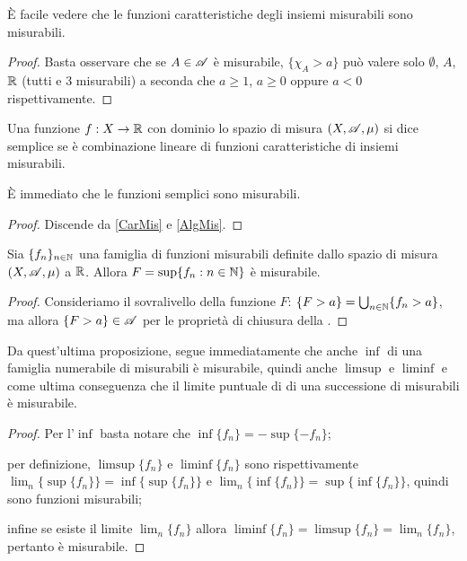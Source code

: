 \begin{remark}
	\label{CarMis}
	È facile vedere che le funzioni caratteristiche degli insiemi misurabili sono misurabili.
\end{remark}
\begin{proof}
	Basta osservare che se $A\in \mathscr A$ è misurabile, $\{ \chi_A > a\}$ può valere solo $\emptyset$, $A$, $\mathbb R$ (tutti e 3 misurabili) a seconda che
	$a\geq 1$, $a\geq 0$ oppure $a < 0$ rispettivamente.
\end{proof}

\begin{definition}
	Una funzione $f:X \rightarrow \mathbb R$ con dominio lo spazio di misura $(X,\mathscr A,\mu)$ si dice semplice se è combinazione lineare di
	funzioni caratteristiche di insiemi misurabili.
\end{definition}
\begin{remark}
	È immediato che le funzioni semplici sono misurabili.
\end{remark}
\begin{proof}
	Discende da \cref{CarMis} e \cref{AlgMis}.
\end{proof}


\begin{proposition}
	Sia $\{f_n\}_{n\in \mathbb N}$ una famiglia di funzioni misurabili definite dallo spazio di misura $(X,\mathscr A,\mu)$ a $\mathbb R$.
	Allora $F=\sup\{f_n:n\in \mathbb N\}$ è misurabile.
\end{proposition}
\begin{proof}
	Consideriamo il sovralivello della funzione $F$: $\{F>a\}=\bigcup_{n\in \mathbb N}\{f_n>a\}$, ma allora $\{F>a\}\in \mathscr A$ per le proprietà 
	di chiusura della \sigalg.
\end{proof}

\begin{remark}
	\label{LimMis}
	Da quest'ultima proposizione, segue immediatamente che anche $\inf$ di una famiglia numerabile di misurabili è misurabile,
	quindi anche $\limsup$ e $\liminf$ e come ultima conseguenza che il limite puntuale di di una successione di misurabili è misurabile.
\end{remark}
\begin{proof}
	Per l'$\inf$ basta notare che $\inf\{f_n\}=-\sup\{-f_n\}$;
	
	per definizione, $\limsup\{f_n\}$ e $\liminf\{f_n\}$ sono rispettivamente $\lim_n\{\sup\{f_n\}\}=\inf\{\sup\{f_n\}\}$ e
	$\lim_n\{\inf\{f_n\}\}=\sup\{\inf\{f_n\}\}$, quindi sono funzioni misurabili;
	
	infine se esiste il limite $\lim_n\{f_n\}$ allora $\liminf\{f_n\}=\limsup\{f_n\}=\lim_n\{f_n\}$, pertanto è misurabile.
\end{proof}

